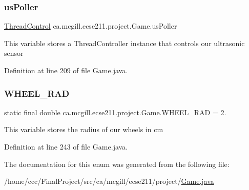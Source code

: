 \subsubsection{\texorpdfstring{us\+Poller}{usPoller}}
{\footnotesize\ttfamily \hyperlink{classca_1_1mcgill_1_1ecse211_1_1threads_1_1_thread_control}{Thread\+Control} ca.\+mcgill.\+ecse211.\+project.\+Game.\+us\+Poller}

This variable stores a Thread\+Controller instance that controls our ultrasonic sensor 

Definition at line 209 of file Game.\+java.

\mbox{\label{enumca_1_1mcgill_1_1ecse211_1_1project_1_1_game_a91bd64670c2a91d006c907142783b1f8}} 
\subsubsection{\texorpdfstring{W\+H\+E\+E\+L\+\_\+\+R\+AD}{WHEEL\_RAD}}
{\footnotesize\ttfamily  static  final double ca.\+mcgill.\+ecse211.\+project.\+Game.\+W\+H\+E\+E\+L\+\_\+\+R\+AD = 2.\hspace{0.3cm}{\ttfamily [static]}}

This variable stores the radius of our wheels in cm 

Definition at line 243 of file Game.\+java.



The documentation for this enum was generated from the following file\+:\begin{DoxyCompactItemize}
\item 
/home/ccc/\+Final\+Project/src/ca/mcgill/ecse211/project/\hyperlink{_game_8java}{Game.\+java}\end{DoxyCompactItemize}
